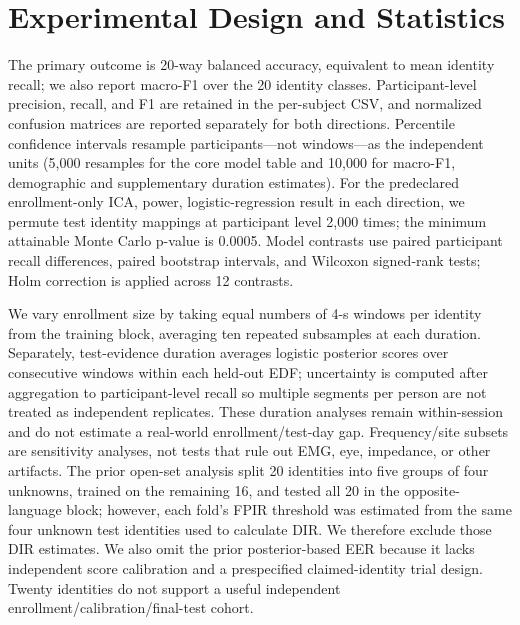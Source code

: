 \documentclass[conference]{IEEEtran}
\begin{document}
\section{Experimental Design and Statistics}
The primary outcome is 20-way balanced accuracy, equivalent to mean identity recall; we also report macro-F1 over the 20 identity classes. Participant-level precision, recall, and F1 are retained in the per-subject CSV, and normalized confusion matrices are reported separately for both directions. Percentile confidence intervals resample participants—not windows—as the independent units (5,000 resamples for the core model table and 10,000 for macro-F1, demographic and supplementary duration estimates). For the predeclared enrollment-only ICA, power, logistic-regression result in each direction, we permute test identity mappings at participant level 2,000 times; the minimum attainable Monte Carlo p-value is 0.0005. Model contrasts use paired participant recall differences, paired bootstrap intervals, and Wilcoxon signed-rank tests; Holm correction is applied across 12 contrasts.

We vary enrollment size by taking equal numbers of 4-s windows per identity from the training block, averaging ten repeated subsamples at each duration. Separately, test-evidence duration averages logistic posterior scores over consecutive windows within each held-out EDF; uncertainty is computed after aggregation to participant-level recall so multiple segments per person are not treated as independent replicates. These duration analyses remain within-session and do not estimate a real-world enrollment/test-day gap. Frequency/site subsets are sensitivity analyses, not tests that rule out EMG, eye, impedance, or other artifacts. The prior open-set analysis split 20 identities into five groups of four unknowns, trained on the remaining 16, and tested all 20 in the opposite-language block; however, each fold's FPIR threshold was estimated from the same four unknown test identities used to calculate DIR. We therefore exclude those DIR estimates. We also omit the prior posterior-based EER because it lacks independent score calibration and a prespecified claimed-identity trial design. Twenty identities do not support a useful independent enrollment/calibration/final-test cohort.
\end{document}
